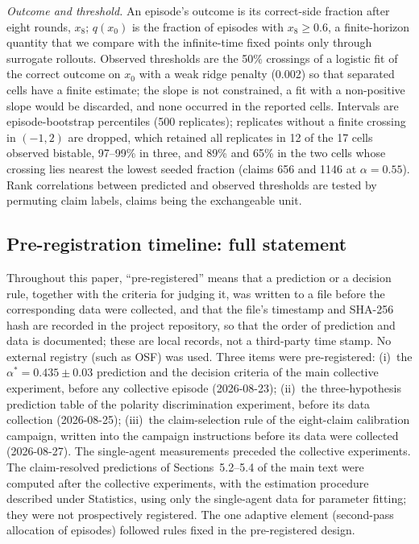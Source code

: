\documentclass[11pt]{article}
\newcommand{\astar}{\alpha^{*}}
\begin{document}
\emph{Outcome and threshold.} An episode's outcome is its correct-side
fraction after eight rounds, $x_8$; $q(x_0)$ is the fraction of episodes with
$x_8 \ge 0.6$, a finite-horizon quantity that we compare with the
infinite-time fixed points only through surrogate rollouts. Observed
thresholds are the 50\% crossings of a logistic fit of the correct outcome on
$x_0$ with a weak ridge penalty (0.002) so that separated cells have a
finite estimate; the slope is not constrained, a fit with a non-positive slope
would be discarded, and none occurred in the reported cells. Intervals are
episode-bootstrap percentiles (500 replicates); replicates without a finite
crossing in $(-1, 2)$ are dropped, which retained all replicates in 12 of the
17 cells observed bistable, 97--99\% in three, and 89\% and 65\% in the two
cells whose crossing lies nearest the lowest seeded fraction (claims 656 and
1146 at $\alpha = 0.55$). Rank correlations between predicted and observed thresholds are
tested by permuting claim labels, claims being the exchangeable unit.

\subsection{Pre-registration timeline: full statement}

Throughout this paper, ``pre-registered'' means that a prediction or a
decision rule, together with the criteria for judging it, was written to a
file before the corresponding data were collected, and that the file's
timestamp and SHA-256 hash are recorded in the project repository, so that
the order of prediction and data is documented; these are local records, not
a third-party time stamp. No external registry (such as OSF) was used. Three items were
pre-registered: (i)~the $\astar = 0.435 \pm 0.03$ prediction and the decision
criteria of the main collective experiment, before any collective episode
(2026-08-23); (ii)~the three-hypothesis prediction table of the polarity
discrimination experiment, before its data collection (2026-08-25);
(iii)~the claim-selection rule of the eight-claim calibration campaign,
written into the campaign instructions before its data were collected
(2026-08-27). The single-agent measurements preceded the collective
experiments. The claim-resolved predictions of
Sections~5.2--5.4 of the main text were computed after the
collective experiments, with the estimation procedure described under
Statistics, using only the single-agent data for parameter fitting; they were
not prospectively registered. The one adaptive element (second-pass allocation of episodes)
followed rules fixed in the pre-registered design.
\end{document}
